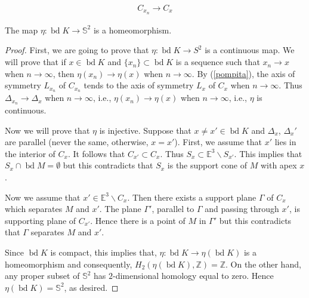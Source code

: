 \documentclass[10pt,a4paper]{amsart}
\newcommand{\bd}{\operatorname*{bd}}
\begin{document}
\begin{eqnarray}\label{pompita}
C_{x_n} \rightarrow C_x
\end{eqnarray}

\begin{lemma}\label{homeo}
The  map $\eta: \bd K\to \mathbb S^2$ is a homeomorphism.
\end{lemma}

\begin{proof} 
First, we are going to prove that $\eta: \bd K\to S^2$ is a continuous map. 
We will prove that if $x\in \bd K$ and $\{x_n\}\subset \bd K$ is a sequence such that $x_n\rightarrow x$ when $n \rightarrow \infty$, then $\eta(x_n)\rightarrow \eta(x)$ when $n \rightarrow \infty$. By (\ref{pompita}), the axis of symmetry $L_{x_n}$ of $C_{x_n}$ tends to the axis of symmetry $L_x$ of $C_{x}$ when $n \rightarrow \infty$. Thus  
$\Delta_{x_n}\rightarrow \Delta_x$ when $n \rightarrow \infty$, i.e., $\eta(x_n)\rightarrow \eta(x)$ when $n \rightarrow \infty$, i.e., $\eta$ is continuous.

   
Now we will prove that $\eta$ is injective. Suppose that $x\not=x' \in \bd K$ and $\Delta_x$, $\Delta_x'$ are parallel (never the same, otherwise, $x=x'$). First, we assume that $x'$ lies in the interior of $C_x$. It follows that $C_{x'}\subset C_x$. Thus $S_x\subset \mathbb{E}^3 \backslash S_{x'}$. This implies that $S_x\cap \bd M=\emptyset$  but this contradicts that $S_x$ is the support cone of $M$ with apex $x$. 
 
Now we assume that $x'\in \mathbb{E}^3 \backslash C_x$. Then there exists a support plane $\Gamma$ of $C_x$ which separates $M$ and 
$x'$. The plane $\Gamma'$, parallel to $\Gamma$ and passing through $x'$, is supporting plane of $C_{x'}$. Hence there is a point of $M$ in $\Gamma'$ but this contradicts that $\Gamma$ separates $M$ and 
$x'$.

Since $\bd K$ is compact, this implies that,  
  $\eta: \bd K\to \eta(\bd K)$  is a homeomorphism and consequently, $H_{2}(\eta(\bd K), \mathbb Z)=\mathbb Z$. On the other hand, any proper subset of $ \mathbb S^2$ has $2$-dimensional homology equal to zero. Hence  $\eta(\bd K)= \mathbb S^2$, as desired.
\end{proof}
\end{document}
